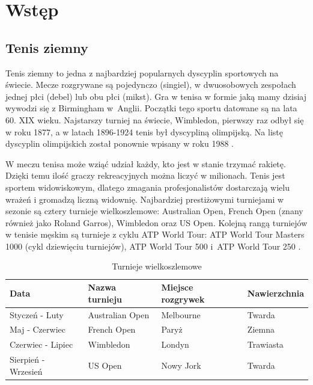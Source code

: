 


\maketitle
\tableofcontents

\chapter{Wstęp}

\section{Tenis ziemny}
\label{Sec:Tenis}
Tenis ziemny to jedna z najbardziej popularnych dyscyplin sportowych na świecie. Mecze rozgrywane są pojedynczo (singiel), w dwuosobowych zespołach jednej płci (debel) lub obu płci (mikst). Gra w tenisa w formie jaką mamy dzisiaj wywodzi się z Birmingham w~Anglii. Początki tego sportu datowane są na lata 60. XIX wieku. Najstarszy turniej na świecie, Wimbledon, pierwszy raz odbył się w roku 1877, a w latach 1896-1924 tenis był dyscypliną olimpijską. Na listę dyscyplin olimpijskich został ponownie wpisany w roku 1988 \cite{tenis01}.

W meczu tenisa może wziąć udział każdy, kto jest w stanie trzymać rakietę. Dzięki temu ilość graczy rekreacyjnych można liczyć w milionach. Tenis jest sportem widowiskowym, dlatego zmagania profesjonalistów dostarczają wielu wrażeń i gromadzą liczną widownię. Najbardziej prestiżowymi turniejami w sezonie są cztery turnieje wielkoszlemowe: Australian Open, French Open (znany również jako Roland Garros), Wimbledon oraz US Open. Kolejną rangą turniejów w tenisie męskim są turnieje z cyklu ATP World Tour: ATP World Tour Masters 1000 (cykl dziewięciu turniejów), ATP World Tour 500 i~ATP World Tour 250 \cite{tenis02}.

\begin{table}[H]
\centering
\caption{Turnieje wielkoszlemowe \cite{tenis02}}
\label{Tab:Slam}
\begin{tabular}{|l|l|l|l|}
\hline
\textbf{Data}       & \textbf{Nazwa turnieju}     & \textbf{Miejsce rozgrywek} & \textbf{Nawierzchnia} \\ \hline
Styczeń - Luty      & Australian Open             & Melbourne                  & Twarda                \\ \hline
Maj - Czerwiec      & French Open  				  & Paryż                      & Ziemna                \\ \hline
Czerwiec - Lipiec   & Wimbledon                   & Londyn                     & Trawiasta             \\ \hline
Sierpień - Wrzesień & US Open                     & Nowy Jork                  & Twarda                \\ \hline
\end{tabular}
\end{table}

